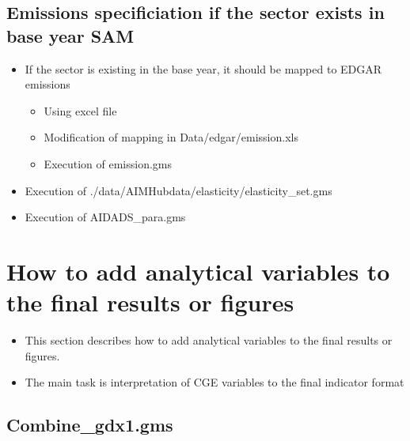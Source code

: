 \documentclass[10pt,a4paper,titlepage,dvipdfmx]{book}
\begin{document}
\subsection{\label{subsec:EssPro}Emissions specificiation if the sector exists in base year SAM}

\begin{itemize}
\item If the sector is existing in the base year, it should be mapped to EDGAR emissions
\begin{itemize}
\item Using excel file
\item Modification of mapping in Data/edgar/emission.xls
\item Execution of emission.gms
\end{itemize}

\item Execution of ./data/AIMHubdata/elasticity/elasticity\_set.gms
\item Execution of AIDADS\_para.gms
\end{itemize}


\section{\label{sec:HowAddAnaVarFinRes}How to add analytical variables to the final results or figures}


\begin{itemize}
\item This section describes how to add analytical variables to the final results or figures.
\item The main task is interpretation of CGE variables to the final indicator format
\end{itemize}
\subsection{\label{subsec:Com1}Combine\_gdx1.gms}
\end{document}
